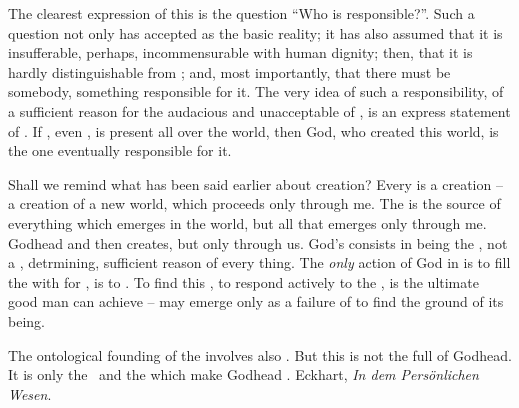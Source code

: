 {The clearest expression of this  is the 
question ``Who is responsible?''. Such a question not only has accepted 
 as the basic reality; it has also assumed that it is 
insufferable, perhaps, incommensurable with human dignity; then, that 
it is hardly distinguishable from ; and, most importantly, 
that there must be somebody, something responsible for it.
The very idea of such a responsibility, of a sufficient reason for the 
audacious and unacceptable  of , is an express 
statement of . If , even , is 
present all over the world, then God, who created this world, is the 
one eventually responsible for it.

\pa
Shall we remind what has been said earlier about creation?
Every  is a creation -- a creation of a new world, 
which proceeds only through me. The  is the source of 
everything which emerges in the world, but all that emerges only 
through me. Godhead  and then creates, but only through us. 
God's  consists in being the , not a 
, detrmining, sufficient reason of every  
thing. The {\em only} action of God in  is to fill the 
 with  for , is to . 
To find this , to respond actively to the 
, is the ultimate good man can achieve -- 
 may emerge only as a failure of  to find the 
 ground of its being.


\pa
The ontological founding of the  involves also 
. But this is not the full  of Godhead. 
%
It 
is only the \sch\ and the  which make Godhead 
. 
{Eckhart, {\em In dem Pers\"{o}nlichen Wesen}.}


}
